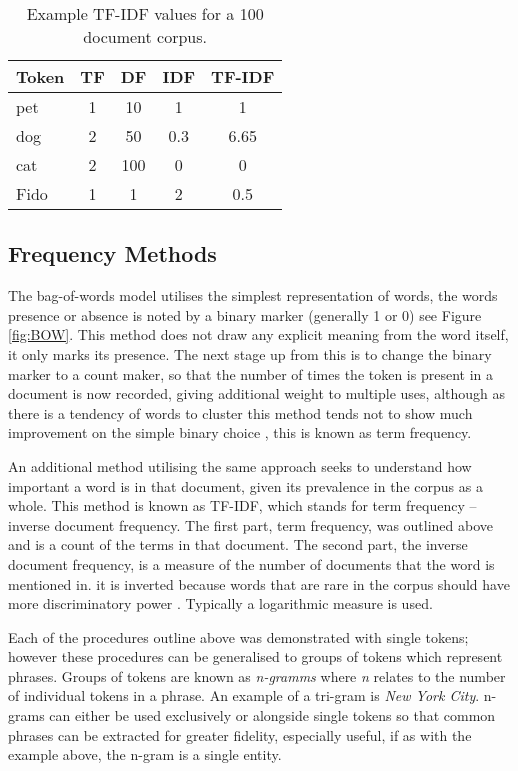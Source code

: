 \begin{table}[]
\centering
\begin{tabular}{@{}lcccc@{}}
\toprule
\textbf{Token} & \multicolumn{1}{l}{\textbf{TF}} & \multicolumn{1}{l}{\textbf{DF}} & \multicolumn{1}{l}{\textbf{IDF}} & \multicolumn{1}{l}{\textbf{TF-IDF}} \\ \midrule
pet  & 1 & 10  & 1   & 1    \\
dog  & 2 & 50  & 0.3 & 6.65 \\
cat  & 2 & 100 & 0   & 0    \\
Fido & 1 & 1   & 2   & 0.5  \\ \bottomrule
\end{tabular}
\caption{\label{tab:search} Example TF-IDF values for a 100 document corpus.}
\end{table}

\subsection{Frequency Methods}

The bag-of-words model utilises the simplest representation of words, the words presence or absence is noted by a binary marker (generally 1 or 0) see Figure \ref{fig:BOW}. This method does not draw any explicit meaning from the word itself, it only marks its presence. The next stage up from this is to change the binary marker to a count maker, so that the number of times the token is present in a document is now recorded, giving additional weight to multiple uses, although as there is a tendency of words to cluster this method tends not to show much improvement on the simple binary choice \parencite{eisenstein2018natural}, this is known as term frequency. 

An additional method utilising the same approach seeks to understand how important a word is in that document, given its prevalence in the corpus as a whole. This method is known as TF-IDF, which stands for term frequency – inverse document frequency. The first part, term frequency, was outlined above and is a count of the terms in that document. The second part, the inverse document frequency, is a measure of the number of documents that the word is mentioned in. it is inverted because words that are rare in the corpus should have more discriminatory power  \parencite{manning2008introduction}. Typically a logarithmic measure is used. 

Each of the procedures outline above was demonstrated with single tokens; however these procedures can be generalised to groups of tokens which represent phrases. Groups of tokens are known as \emph{n-gramms} where  \emph{n} relates to the number of individual tokens in a phrase. An example of a tri-gram is \emph{New York City}. n-grams can either be used exclusively or alongside single tokens so that common phrases can be extracted for greater fidelity, especially useful, if as with the example above, the n-gram is a single entity. 

